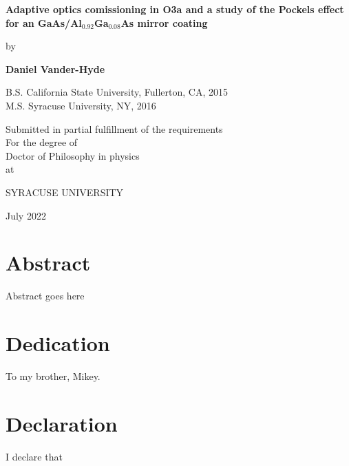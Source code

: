 \documentclass[12pt]{report}
\begin{document}
\begin{titlepage}
\begin{center}
       \vspace*{1cm}

       \textbf{\LARGE Adaptive optics comissioning in O3a and a study of the Pockels effect for an GaAs/Al$_{0.92}$Ga$_{0.08}$As mirror coating}

       \vspace{0.5cm}
       {\large by}
            
       \vspace{0.5cm}

       \textbf{\large Daniel Vander-Hyde}


       \vspace{0.5cm}
       {\large B.S. California State University, Fullerton, CA, 2015}
       \\
       {\large M.S. Syracuse University, NY, 2016}
       
       \vspace{1.0cm}
             
       {\large Submitted in partial fulfillment of the requirements\\
       For the degree of \\
       Doctor of Philosophy in physics\\
       at}

       \vspace{0.5cm}

       {\large \uppercase{Syracuse University}}
       \vfill
     
       July 2022
            
   \end{center}
\end{titlepage}

\chapter*{Abstract}
Abstract goes here

\chapter*{Dedication}
To my brother, Mikey.

\chapter*{Declaration}
I declare that
\end{document}
